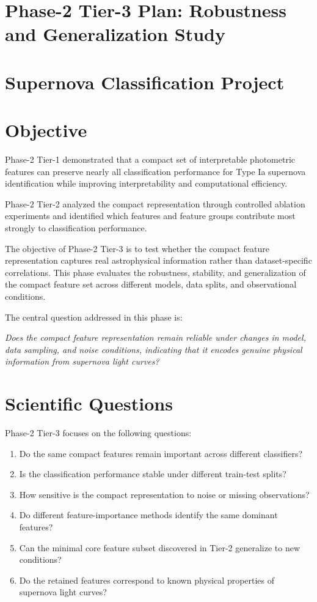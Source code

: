 \section*{Phase-2 Tier-3 Plan: Robustness and Generalization Study}

\section*{Supernova Classification Project}

\section{Objective}

Phase-2 Tier-1 demonstrated that a compact set of interpretable photometric features
can preserve nearly all classification performance for Type Ia supernova identification
while improving interpretability and computational efficiency.

Phase-2 Tier-2 analyzed the compact representation through controlled ablation
experiments and identified which features and feature groups contribute most strongly
to classification performance.

The objective of Phase-2 Tier-3 is to test whether the compact feature representation
captures real astrophysical information rather than dataset-specific correlations.
This phase evaluates the robustness, stability, and generalization of the compact
feature set across different models, data splits, and observational conditions.

The central question addressed in this phase is:

\textit{Does the compact feature representation remain reliable under changes in model,
data sampling, and noise conditions, indicating that it encodes genuine physical
information from supernova light curves?}

\section{Scientific Questions}

Phase-2 Tier-3 focuses on the following questions:

\begin{enumerate}
\item Do the same compact features remain important across different classifiers?
\item Is the classification performance stable under different train-test splits?
\item How sensitive is the compact representation to noise or missing observations?
\item Do different feature-importance methods identify the same dominant features?
\item Can the minimal core feature subset discovered in Tier-2 generalize to new conditions?
\item Do the retained features correspond to known physical properties of supernova light curves?
\end{enumerate}


